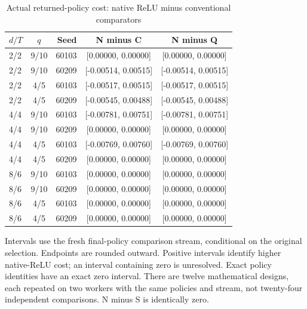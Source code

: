 \begin{table}[htbp]
\centering
\caption{Actual returned-policy cost: native ReLU minus conventional comparators}\label{tab:cost61}
{\small\setlength{\tabcolsep}{3pt}
\begin{tabular}{lcrcc}
\hline
$d/T$ & $q$ & Seed & N minus C & N minus Q \\
\hline
2/2 & 9/10 & 60103 & [0.00000, 0.00000] & [0.00000, 0.00000] \\
2/2 & 9/10 & 60209 & [-0.00514, 0.00515] & [-0.00514, 0.00515] \\
2/2 & 4/5 & 60103 & [-0.00517, 0.00515] & [-0.00517, 0.00515] \\
2/2 & 4/5 & 60209 & [-0.00545, 0.00488] & [-0.00545, 0.00488] \\
4/4 & 9/10 & 60103 & [-0.00781, 0.00751] & [-0.00781, 0.00751] \\
4/4 & 9/10 & 60209 & [0.00000, 0.00000] & [0.00000, 0.00000] \\
4/4 & 4/5 & 60103 & [-0.00769, 0.00760] & [-0.00769, 0.00760] \\
4/4 & 4/5 & 60209 & [0.00000, 0.00000] & [0.00000, 0.00000] \\
8/6 & 9/10 & 60103 & [0.00000, 0.00000] & [0.00000, 0.00000] \\
8/6 & 9/10 & 60209 & [0.00000, 0.00000] & [0.00000, 0.00000] \\
8/6 & 4/5 & 60103 & [0.00000, 0.00000] & [0.00000, 0.00000] \\
8/6 & 4/5 & 60209 & [0.00000, 0.00000] & [0.00000, 0.00000] \\
\hline\end{tabular}}
\par\smallskip
{\footnotesize Intervals use the fresh final-policy comparison stream, conditional on the original selection. Endpoints are rounded outward. Positive intervals identify higher native-ReLU cost; an interval containing zero is unresolved. Exact policy identities have an exact zero interval. There are twelve mathematical designs, each repeated on two workers with the same policies and stream, not twenty-four independent comparisons. N minus S is identically zero.}
\end{table}
